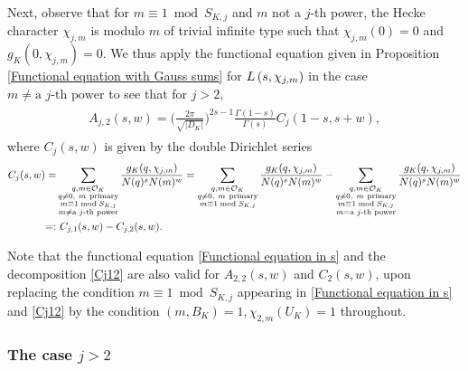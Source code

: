 \documentclass[twoside,leqno,10pt, A4]{amsart}
\begin{document}
  Next, observe that for $m \equiv 1 \bmod S_{K,j}$ and $m$ not a $j$-th power, the Hecke character $\chi_{j,m}$ is modulo $m$ of trivial
infinite type  such that $\chi_{j,m}(0)=0$ and $g_K(0,\chi_{j,m})=0$. We thus apply the functional equation given in Proposition \ref{Functional equation with Gauss sums} for $L\left( s, \chi_{j,m} \right)$ in the case $m \neq \text{a $j$-th power}$ to see that for $j>2$,
\begin{align}
\begin{split}
\label{Functional equation in s}
 A_{j,2}(s,w) =\Big(\frac {2\pi}{\sqrt{|D_K|}}\Big )^{2s-1}\frac {\Gamma(1-s)}{\Gamma(s)} C_j(1-s,s+w),
\end{split}
\end{align}
 where $C_j(s,w)$ is given by the double Dirichlet series
\begin{align}
\label{Cj12}
\begin{split}
		C_j(s,w)=& \sum_{\substack{q, m \in \mathcal O_K \\ q\neq 0, \ m \mathrm{\ primary} \\ m \equiv 1  \bmod {S_{K,j}} \\ m \neq  \text{a $j$-th
power}}}\frac{g_K(q, \chi_{j,m})}{N(q)^sN(m)^w}=\sum_{\substack{q, m \in \mathcal O_K \\ q\neq 0, \ m \mathrm{\ primary} \\ m \equiv 1  \bmod {S_{K,j}}
}}\frac{g_K(q, \chi_{j,m})}{N(q)^sN(m)^w}-\sum_{\substack{q, m \in \mathcal O_K \\ q\neq 0, \ m \mathrm{\ primary} \\ m \equiv 1  \bmod {S_{K,j}} \\ m =
\text{a $j$-th power}}}\frac{g_K(q, \chi_{j,m})}{N(q)^sN(m)^w} \\
=: & \ C_{j,1}(s,w)-C_{j,2}(s,w).
\end{split}
\end{align}	

   Note that the functional equation \eqref{Functional equation in s} and the decomposition \eqref{Cj12} are also valid  for $A_{2,2}(s,w)$ and $C_2(s,w)$, upon replacing the condition $m \equiv 1 \bmod {S_{K,j}}$ appearing in \eqref{Functional equation in s} and \eqref{Cj12} by the condition $(m, B_K)=1, \chi_{2,m}(U_K) =1$ throughout.

\subsubsection{\bf The case $j > 2$}
\label{sec: jlarge}
\end{document}
